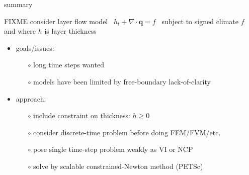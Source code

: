 \documentclass{beamer}
\newcommand\bq{\mathbf{q}}
\newcommand\Div{\nabla\cdot}
\begin{document}
\begin{frame}{summary}

FIXME consider layer flow model \, $h_t + \Div\bq = f$ \, subject to signed climate $f$ and where $h$ is layer thickness

  \begin{itemize}
  \item goals/issues:
    \begin{itemize}
    \item[$\circ$]  long time steps wanted
    \item[$\circ$]  models have been limited by free-boundary lack-of-clarity
    \end{itemize}
  \item approach:
    \begin{itemize}
    \item[$\circ$]  include constraint on thickness: $h\ge 0$
    \item[$\circ$]  consider discrete-time problem before doing FEM/FVM/etc.
    \item[$\circ$]  pose single time-step problem weakly as VI or NCP
    \item[$\circ$]  solve by scalable constrained-Newton method (PETSc)
    \end{itemize}
  \end{itemize}

\end{frame}
\end{document}
